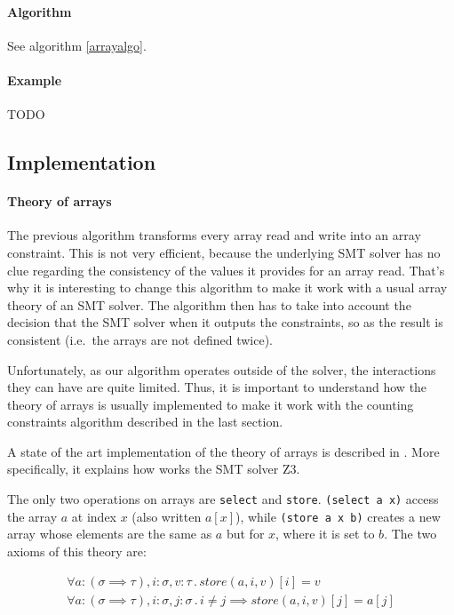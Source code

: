 \documentclass[]{article}
\begin{document}
{{\paragraph{Algorithm}\label{algorithm-1}

See algorithm \ref{arrayalgo}.

\paragraph{Example}\label{example-1}

TODO
}

\subsection{Implementation}

\paragraph{Theory of arrays} The previous algorithm transforms every array read and write into an
array constraint. This is not very efficient, because the underlying SMT
solver has no clue regarding the consistency of the values it provides
for an array read. That's why it is interesting to change this algorithm
to make it work with a usual array theory of an SMT solver. The
algorithm then has to take into account the decision that the SMT solver
when it outputs the constraints, so as the result is consistent
(i.e.~the arrays are not defined twice).

Unfortunately, as our algorithm operates outside of the solver, the
interactions they can have are quite limited. Thus, it is important to
understand how the theory of arrays is usually implemented to make it
work with the counting constraints algorithm described in the last
section.

A state of the art implementation of the theory of arrays is described
in \cite{de2009generalized}. More specifically, it
explains how works the SMT solver Z3.

The only two operations on arrays are \texttt{select} and
\texttt{store}. \texttt{(select\ a\ x)} access the array $a$ at index
$x$ (also written $a[x]$), while \texttt{(store\ a\ x\ b)} creates a
new array whose elements are the same as $a$ but for $x$, where it
is set to $b$. The two axioms of this theory are:

\begin{subequations}
    \begin{align}
        \forall a:(\sigma \implies \tau), i:\sigma, v:\tau\, .\, store(a, i, v)[i] = v
        \\
        \forall a:(\sigma \implies \tau), i:\sigma, j:\sigma\, .\, i \neq j \implies store(a, i, v)[j] = a[j]
    \end{align}



\end{subequations}}
\end{document}

